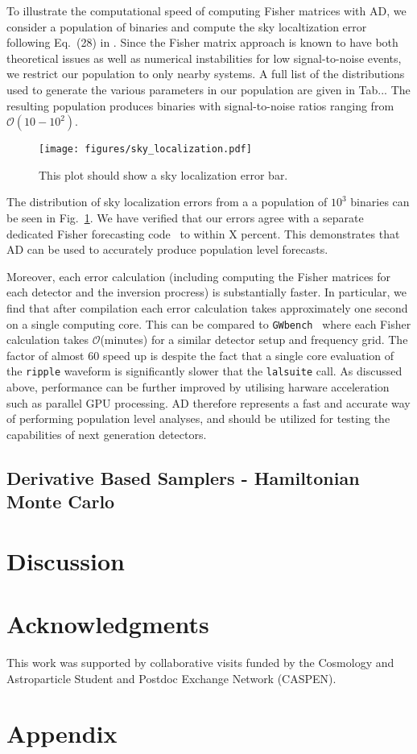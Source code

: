 \documentclass[twocolumn]{aastex631}
\newcommand{\ripple}{\texttt{ripple}\xspace}
\newcommand{\lalsuite}{\texttt{lalsuite}\xspace}
\begin{document}
To illustrate the computational speed of computing Fisher matrices with AD, we consider a population of binaries and compute the sky localtization error following Eq.~(28) in \citep{Iacovelli:2022bbs, Iacovelli:2022mbg}.
Since the Fisher matrix approach is known to have both theoretical issues as well as numerical instabilities for low signal-to-noise events, we restrict our population to only nearby systems.
A full list of the distributions used to generate the various parameters in our population are given in Tab...
The resulting population produces binaries with signal-to-noise ratios ranging from $\mathcal{O}(10-10^2)$.

\begin{figure}[ht!]
    \begin{centering}
        \texttt{[image: figures/sky\_localization.pdf]}
        \caption{
            This plot should show a sky localization error bar.
        }
        \label{fig:sky_localization}
    \end{centering}
\end{figure}

The distribution of sky localization errors from a a population of $10^3$ binaries can be seen in Fig.~\ref{fig:sky_localization}.
We have verified that our errors agree with a separate dedicated Fisher forecasting code~\citep{Borhanian:2020ypi} to within X percent.
This demonstrates that AD can be used to accurately produce population level forecasts.

Moreover, each error calculation (including computing the Fisher matrices for each detector and the inversion procress) is substantially faster.
In particular, we find that after compilation each error calculation takes approximately one second on a single computing core.
This can be compared to \texttt{GWbench}~\citep{Borhanian:2020ypi} where each Fisher calculation takes $\mathcal{O}$(minutes) for a similar detector setup and frequency grid.
The factor of almost 60 speed up is despite the fact that a single core evaluation of the \ripple waveform is significantly slower that the \lalsuite call.
As discussed above, performance can be further improved by utilising harware acceleration such as parallel GPU processing.
AD therefore represents a fast and accurate way of performing population level analyses, and should be utilized for testing the capabilities of next generation detectors.

\subsection{Derivative Based Samplers - Hamiltonian Monte Carlo}
\label{subsec:hmc}

\section{Discussion}
\label{subsec:discussion}

\section{Acknowledgments}
This work was supported by collaborative visits funded by the Cosmology and Astroparticle Student and Postdoc Exchange Network (CASPEN).



\section{Appendix}
\label{sec:appendix}
\end{document}
